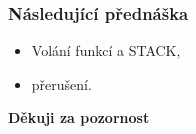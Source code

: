   \begin{frame}
    \frametitle{Následující přednáška}
		
		\begin{itemize}
			\item Volání funkcí a STACK,
			\item přerušení.
		\end{itemize}
		
		\begin{center}
			\textbf{Děkuji za pozornost}
		\end{center}
		
	\end{frame}